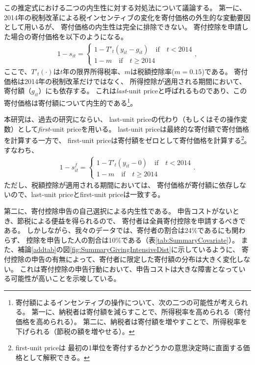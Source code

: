 \documentclass[
  11pt,
  a4paper,
]{article}
\begin{document}
この推定式における二つの内生性に対する対処法について議論する。
第一に、
2014年の税制改革による税インセンティブの変化を寄付価格の外生的な変動要因として用いるが、
寄付価格の内生性は完全に排除できない。
寄付控除を申請した場合の寄付価格を以下のようになる。
\begin{align}
  1 - s_{it} =
  \begin{cases}
    1 - T'_t(y_{it} - g_{it})  \quad\text{if}\quad t < 2014  \\
    1 - m \quad\text{if}\quad t \ge 2014
  \end{cases},
\end{align}
ここで、\(T'_t(\cdot)\)は\(t\)年の限界所得税率、\(m\)は税額控除率(\(m = 0.15\))である。
寄付価格は2014年の税制改革だけではなく、
所得控除が適用される期間において、寄付額（\(g_{it}\)）にも依存する。
これは\emph{last}-unit priceと呼ばれるものであり、この寄付価格は寄付額について内生的である\footnote{寄付額によるインセンティブの操作について、次の二つの可能性が考えられる。
  第一に、納税者は寄付額を減らすことで、所得税率を高められる（寄付価格を高められる）。
  第二に、納税者は寄付額を増やすことで、所得税率を下げられる（節税の額を増やせる）。}。

本研究は、過去の研究にならい、
last-unit priceの代わり（もしくはその操作変数）として\emph{first}-unit priceを用いる。
last-unit priceは最終的な寄付額で寄付価格を計算する一方で、
first-unit priceは寄付額をゼロとして寄付価格を計算する\footnote{first-unit priceは
  最初の1単位を寄付するかどうかの意思決定時に直面する価格として解釈できる。}。
すなわち、
\begin{align}
  1 - s^f_{it} =
  \begin{cases}
    1 - T'_t(y_{it} - 0)  \quad\text{if}\quad t < 2014  \\
    1 - m \quad\text{if}\quad t \ge 2014
  \end{cases}.
\end{align}
ただし、税額控除が適用される期間においては、
寄付価格が寄付額に依存しないので、last-unit priceとfirst-unit priceは一致する。

第二に、寄付控除申告の自己選択による内生性である。
申告コストがないとき、節税による便益を得られるので、
寄付者は全員寄付控除を申請するべきである。
しかしながら、我々のデータでは、寄付者の割合は24\%であるにも関わらず、
控除を申告した人の割合は10\%である（表\ref{tab:SummaryCovariate}）。
また、補論\ref{addtab}の図\ref{fig:SummaryGivingIntensiveDist}に示しているように、
寄付控除の申告の有無によって、寄付者に限定した寄付額の分布は大きく変化しない。
これは寄付控除の申告行動において、申告コストは大きな障害となっている可能性が高いことを示唆している。
\end{document}
